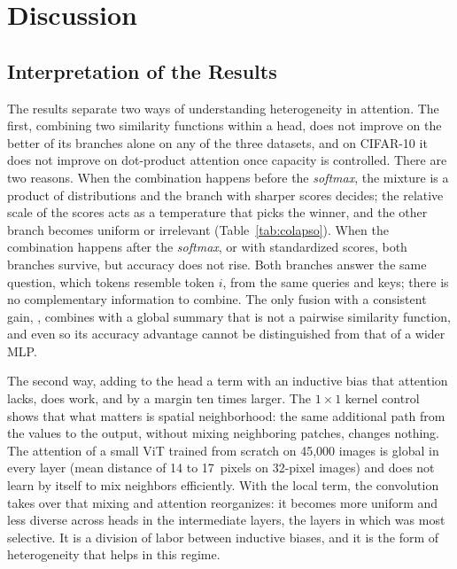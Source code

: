\section{Discussion}
\label{sec:discusion}

\subsection{Interpretation of the Results}
\label{sec:interpretacion}
The results separate two ways of understanding heterogeneity in attention. The first, combining two similarity functions within a head, does not improve on the better of its branches alone on any of the three datasets, and on CIFAR-10 it does not improve on dot-product attention once capacity is controlled. There are two reasons. When the combination happens before the \emph{softmax}, the mixture is a product of distributions and the branch with sharper scores decides; the relative scale of the scores acts as a temperature that picks the winner, and the other branch becomes uniform or irrelevant (Table~\ref{tab:colapso}). When the combination happens after the \emph{softmax}, or with standardized scores, both branches survive, but accuracy does not rise. Both branches answer the same question, which tokens resemble token $i$, from the same queries and keys; there is no complementary information to combine. The only fusion with a consistent gain, , combines  with a global summary that is not a pairwise similarity function, and even so its accuracy advantage cannot be distinguished from that of a wider MLP.

The second way, adding to the head a term with an inductive bias that attention lacks, does work, and by a margin ten times larger. The $1\times1$ kernel control shows that what matters is spatial neighborhood: the same additional path from the values to the output, without mixing neighboring patches, changes nothing. The attention of a small ViT trained from scratch on 45,000 images is global in every layer (mean distance of 14 to 17~pixels on 32-pixel images) and does not learn by itself to mix neighbors efficiently. With the local term, the convolution takes over that mixing and attention reorganizes: it becomes more uniform and less diverse across heads in the intermediate layers, the layers in which  was most selective. It is a division of labor between inductive biases, and it is the form of heterogeneity that helps in this regime.

